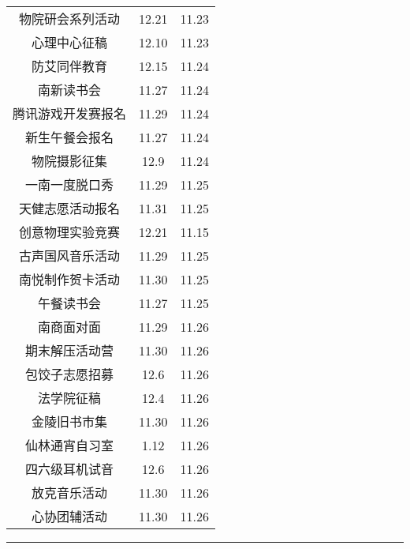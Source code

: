 \documentclass[letterpaper, 12pt]{article}
\begin{document}
\begin{multicols}{2}
{\begin{longtable}{|c|c|c|}
    物院研会系列活动 & 12.21 & 11.23\\
    心理中心征稿 & 12.10 & 11.23\\
    防艾同伴教育 & 12.15 & 11.24\\
    南新读书会 & 11.27 & 11.24\\
    腾讯游戏开发赛报名 & 11.29 & 11.24\\
    新生午餐会报名 & 11.27 & 11.24\\
    物院摄影征集 & 12.9 & 11.24\\
    一南一度脱口秀 & 11.29 & 11.25\\
    天健志愿活动报名 & 11.31 & 11.25\\
    创意物理实验竞赛 & 12.21 & 11.15\\
    古声国风音乐活动 & 11.29 & 11.25\\
    南悦制作贺卡活动 & 11.30 & 11.25\\
    午餐读书会 & 11.27 & 11.25\\
    南商面对面 & 11.29 & 11.26\\
    期末解压活动营 & 11.30 & 11.26\\
    包饺子志愿招募 & 12.6 & 11.26\\
    法学院征稿 & 12.4 & 11.26\\
    金陵旧书市集 & 11.30 & 11.26\\
    仙林通宵自习室 & 1.12 & 11.26\\
    四六级耳机试音 & 12.6 & 11.26\\
    放克音乐活动 & 11.30 & 11.26\\
    心协团辅活动 & 11.30 & 11.26\\
    
    \hline
\end{longtable}
\unskip
\unpenalty
\unpenalty}\unvbox\colbbox
\end{multicols}
\hrule
\pagebreak
\end{document}
